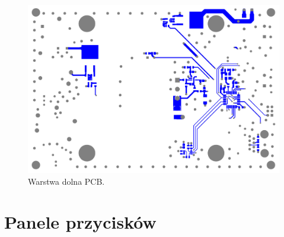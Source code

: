\begin{figure}
    \begin{center}
        \includegraphics[width = 15cm]{zalaczniki/obciazenie/Obciążenie_aktywne_Strona_12.jpg}
        \caption{Warstwa dolna PCB.}
    \end{center}
\end{figure}


\nopagebreak

\chapter{Panele przycisków}


